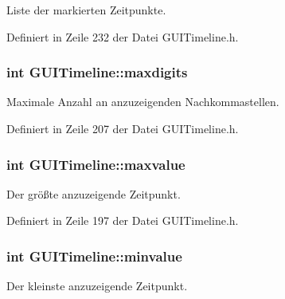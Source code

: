 Liste der markierten Zeitpunkte. 



Definiert in Zeile 232 der Datei G\-U\-I\-Timeline.\-h.

\hypertarget{classGUITimeline_a880c85a1838b77e7dd2c03601c15e36b}{
\subsubsection[{maxdigits}]{\setlength{\rightskip}{0pt plus 5cm}int G\-U\-I\-Timeline\-::maxdigits\hspace{0.3cm}{\ttfamily [private]}}}\label{classGUITimeline_a880c85a1838b77e7dd2c03601c15e36b}


Maximale Anzahl an anzuzeigenden Nachkommastellen. 



Definiert in Zeile 207 der Datei G\-U\-I\-Timeline.\-h.

\hypertarget{classGUITimeline_a6c639803db9c5afff38d3221242da912}{
\subsubsection[{maxvalue}]{\setlength{\rightskip}{0pt plus 5cm}int G\-U\-I\-Timeline\-::maxvalue\hspace{0.3cm}{\ttfamily [private]}}}\label{classGUITimeline_a6c639803db9c5afff38d3221242da912}


Der größte anzuzeigende Zeitpunkt. 



Definiert in Zeile 197 der Datei G\-U\-I\-Timeline.\-h.

\hypertarget{classGUITimeline_aad9f2b796d0d7c086cfe0094b3ef10c5}{
\subsubsection[{minvalue}]{\setlength{\rightskip}{0pt plus 5cm}int G\-U\-I\-Timeline\-::minvalue\hspace{0.3cm}{\ttfamily [private]}}}\label{classGUITimeline_aad9f2b796d0d7c086cfe0094b3ef10c5}


Der kleinste anzuzeigende Zeitpunkt. 



